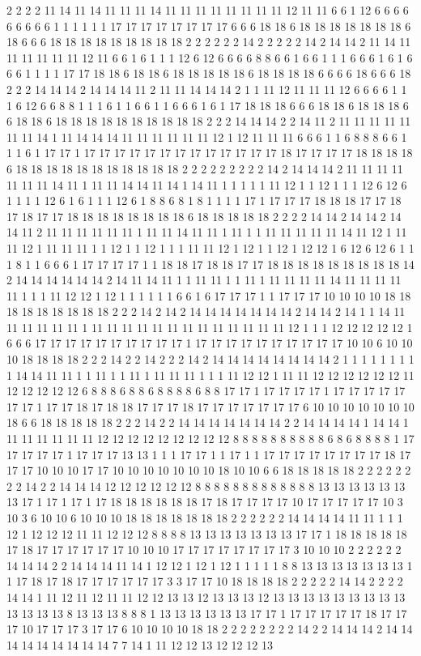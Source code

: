 2 2 2 2 11 14 11 14 11 11 11 14 11 11 11 11 11 11 11 11 12 11 11 6 6 1 12 6 6 6 6 6 6 6 6 6 1 1 1 1 1 1 17 17 17 17 17 17 17 17 6 6 6 18 18 6 18 18 18 18 18 18 18 6 18 6 6 6 18 18 18 18 18 18 18 18 18 2 2 2 2 2 2 14 2 2 2 2 2 14 2 14 14 2 11 14 11 11 11 11 11 11 12 11 6 6 1 6 1 1 1 12 6 12 6 6 6 6 8 8 6 6 1 6 6 1 1 1 6 6 6 1 6 1 6 6 6 1 1 1 1 17 17 18 18 6 18 18 6 18 18 18 18 18 6 18 18 18 18 6 6 6 6 18 6 6 6 18 2 2 2 14 14 14 2 14 14 14 11 2 11 11 14 14 14 2 1 1 11 12 11 11 11 12 6 6 6 6 1 1 1 6 12 6 6 8 8 1 1 1 6 1 1 6 6 1 1 6 6 6 1 6 1 17 18 18 18 6 6 6 18 18 6 18 18 18 6 6 18 18 6 18 18 18 18 18 18 18 18 18 18 2 2 2 14 14 14 2 2 14 11 2 11 11 11 11 11 11 11 14 1 11 14 14 14 11 11 11 11 11 11 12 1 12 11 11 11 6 6 6 1 1 6 8 8 8 6 6 1 1 1 6 1 17 17 1 17 17 17 17 17 17 17 17 17 17 17 17 17 18 17 17 17 17 18 18 18 18 6 18 18 18 18 18 18 18 18 18 18 18 2 2 2 2 2 2 2 2 2 14 2 14 14 14 2 11 11 11 11 11 11 11 14 11 1 11 11 14 14 11 14 1 14 11 1 1 1 1 1 11 12 1 1 12 1 1 1 12 6 12 6 1 1 1 1 12 6 1 6 1 1 1 12 6 1 8 8 6 8 1 8 1 1 1 1 17 1 17 17 17 18 18 18 17 17 18 17 18 17 17 18 18 18 18 18 18 18 18 6 18 18 18 18 18 2 2 2 2 14 14 2 14 14 2 14 14 11 2 11 11 11 11 11 11 1 11 11 14 11 11 1 11 1 1 11 11 11 11 11 14 11 12 1 11 11 12 1 11 11 11 1 1 12 1 1 12 1 1 1 11 11 12 1 12 1 1 12 1 12 12 1 6 12 6 12 6 1 1 1 8 1 1 6 6 6 1 17 17 17 17 1 1 18 18 17 18 18 17 17 18 18 18 18 18 18 18 18 18 14 2 14 14 14 14 14 14 2 14 11 14 11 1 1 11 11 1 1 11 1 11 11 11 11 14 11 11 11 11 11 1 1 1 11 12 12 1 12 1 1 1 1 1 1 6 6 1 6 17 17 17 1 1 17 17 17 10 10 10 10 18 18 18 18 18 18 18 18 18 2 2 2 14 2 14 2 14 14 14 14 14 14 14 2 14 14 2 14 1 1 14 11 11 11 11 11 11 1 11 11 11 11 11 11 11 11 11 11 11 11 11 12 1 1 1 12 12 12 12 12 1 6 6 6 17 17 17 17 17 17 17 17 17 17 1 17 17 17 17 17 17 17 17 17 17 10 10 6 10 10 10 18 18 18 18 2 2 2 14 2 2 14 2 2 2 14 2 14 14 14 14 14 14 14 14 2 1 1 1 1 1 1 1 1 1 14 14 11 11 1 1 11 1 1 11 1 11 11 11 1 1 1 11 12 12 1 11 11 12 12 12 12 12 12 11 12 12 12 12 12 6 8 8 8 6 8 8 6 8 8 8 8 6 8 8 17 17 1 17 17 17 17 1 17 17 17 17 17 17 17 1 17 17 18 17 18 18 17 17 17 18 17 17 17 17 17 17 17 6 10 10 10 10 10 10 10 18 6 6 18 18 18 18 18 2 2 2 14 2 2 14 14 14 14 14 14 14 2 2 14 14 14 14 1 14 14 1 11 11 11 11 11 11 12 12 12 12 12 12 12 12 12 8 8 8 8 8 8 8 8 8 8 6 8 6 8 8 8 8 1 17 17 17 17 17 1 17 17 17 13 13 1 1 1 17 17 1 1 17 1 1 17 17 17 17 17 17 17 17 18 17 17 17 10 10 10 17 17 10 10 10 10 10 10 10 18 10 10 6 6 18 18 18 18 18 2 2 2 2 2 2 2 2 14 2 2 14 14 14 12 12 12 12 12 12 8 8 8 8 8 8 8 8 8 8 8 8 8 13 13 13 13 13 13 13 17 1 17 1 17 1 17 18 18 18 18 18 18 17 18 17 17 17 17 10 17 17 17 17 17 10 3 10 3 6 10 10 6 10 10 10 18 18 18 18 18 18 18 2 2 2 2 2 2 14 14 14 14 11 11 1 1 1 12 1 12 12 12 11 11 12 12 12 8 8 8 8 13 13 13 13 13 13 13 17 17 1 18 18 18 18 18 17 18 17 17 17 17 17 17 10 10 10 17 17 17 17 17 17 17 17 3 10 10 10 2 2 2 2 2 2 14 14 14 2 2 14 14 14 11 14 1 12 12 1 12 1 12 1 1 1 1 1 8 8 13 13 13 13 13 13 13 1 1 17 18 17 18 17 17 17 17 17 17 3 3 17 17 10 18 18 18 18 2 2 2 2 2 14 14 2 2 2 2 14 14 1 11 12 11 12 11 11 12 12 13 13 12 13 13 13 12 13 13 13 13 13 13 13 13 13 13 13 13 13 8 13 13 13 8 8 8 1 13 13 13 13 13 13 17 17 1 17 17 17 17 17 18 17 17 17 10 17 17 17 3 17 17 6 10 10 10 10 18 18 2 2 2 2 2 2 2 2 14 2 2 14 14 14 2 14 14 14 14 14 14 14 14 14 7 7 14 1 11 12 12 13 12 12 12 13 